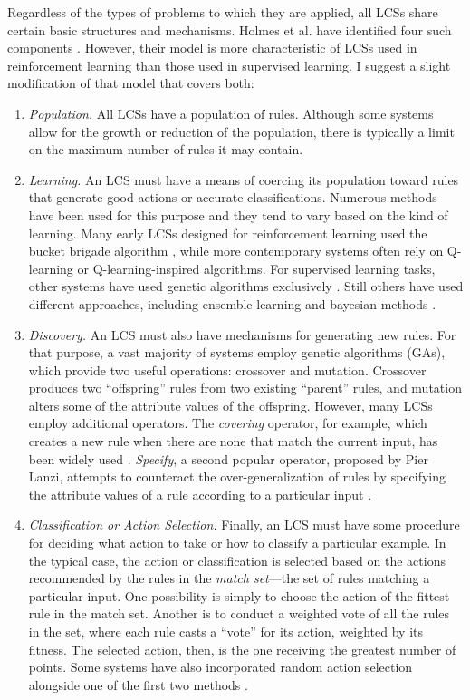 \documentclass[11pt]{article}
\begin{document}
Regardless of the types of problems to which they are applied, all LCSs share certain basic structures and mechanisms. Holmes et al. have identified four such components  \cite{holmes_learning_2002}. However, their model is more characteristic of LCSs used in reinforcement learning than those used in supervised learning. I suggest a slight modification of that model that covers both:
\begin{enumerate}
\item \emph{Population.} All LCSs have a population of rules. Although some systems allow for the growth or reduction of the population, there is typically a limit on the maximum number of rules it may contain.
\item \emph{Learning.} An LCS must have a means of coercing its population toward rules that generate good actions or accurate classifications. Numerous methods have been used for this purpose and they tend to vary based on the kind of learning. Many early LCSs designed for reinforcement learning used the bucket brigade algorithm \cite{holland_properties_1985}, while more contemporary systems often rely on Q-learning \cite{c._j._c._h._learning_1989, orriols-puig_fuzzy-ucs:_2009} or Q-learning-inspired algorithms. For supervised learning tasks, other systems have used genetic algorithms exclusively \cite{llora_towards_2007}. Still others have used different approaches, including ensemble learning \cite{gao_learning_2005} and bayesian methods \cite{hai_h._dam_bcs:_2006}.
\item \emph{Discovery.} An LCS must also have mechanisms for generating new rules. For that purpose, a vast majority of systems employ genetic algorithms (GAs), which provide two useful operations: crossover and mutation. Crossover produces two ``offspring'' rules from two existing ``parent'' rules, and mutation alters some of the attribute values of the offspring. However, many LCSs employ additional operators. The \emph{covering} operator, for example, which creates a new rule when there are none that match the current input, has been widely used \cite{orriols-puig_fuzzy-ucs:_2009, wilson_classifier_1995, bernado-mansilla_accuracy-based_2003}. \emph{Specify}, a second popular operator, proposed by Pier Lanzi,  attempts to counteract the over-generalization of rules by specifying the attribute values of a rule according to a particular input \cite{lanzi_study_1997}. 
\item \emph{Classification or Action Selection.} Finally, an LCS must have some procedure for deciding what action to take or how to classify a particular example. In the typical case, the action or classification is selected based on the actions recommended by the rules in the \emph{match set}---the set of rules matching a particular input. One possibility is simply to choose the action of the fittest rule in the match set. Another is to conduct a weighted vote of all the rules in the set, where each rule casts a ``vote'' for its action, weighted by its fitness. The selected action, then, is the one receiving the greatest number of points. Some systems have also incorporated random action selection alongside one of the first two methods \cite{wilson_classifier_1995}.
\end{enumerate}
\end{document}
